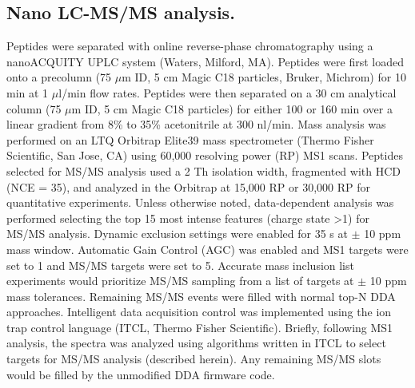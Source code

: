 \subsection*{Nano LC-MS/MS analysis.}
Peptides were separated with online reverse-phase chromatography using a nanoACQUITY UPLC system (Waters, Milford, MA). Peptides were first loaded onto a precolumn (75 $\mu$m ID, 5 cm Magic C18 particles, Bruker, Michrom) for 10 min at 1 $\mu$l/min flow rates. Peptides were then separated on a 30 cm analytical column (75 $\mu$m ID, 5 cm Magic C18 particles) for either 100 or 160 min over a linear gradient from 8\% to 35\% acetonitrile at 300 nl/min. Mass analysis was performed on an LTQ Orbitrap Elite39 mass spectrometer (Thermo Fisher Scientific, San Jose, CA) using 60,000 resolving power (RP) MS1 scans. Peptides selected for MS/MS analysis used a 2 Th isolation width, fragmented with HCD (NCE = 35), and analyzed in the Orbitrap at 15,000 RP or 30,000 RP for quantitative experiments. Unless otherwise noted, data-dependent analysis was performed selecting the top 15 most intense \mz{} features (charge state >1) for MS/MS analysis. Dynamic exclusion settings were enabled for 35 s at $\pm$ 10 ppm mass window. Automatic Gain Control (AGC) was enabled and MS1 targets were set to 1 and MS/MS targets were set to 5. Accurate mass inclusion list experiments would prioritize MS/MS sampling from a list of targets at $\pm$ 10 ppm mass tolerances. Remaining MS/MS events were filled with normal top-N DDA approaches. Intelligent data acquisition control was implemented using the ion trap control language (ITCL, Thermo Fisher Scientific). Briefly, following MS1 analysis, the spectra was analyzed using algorithms written in ITCL to select targets for MS/MS analysis (described herein). Any remaining MS/MS slots would be filled by the unmodified DDA firmware code.

